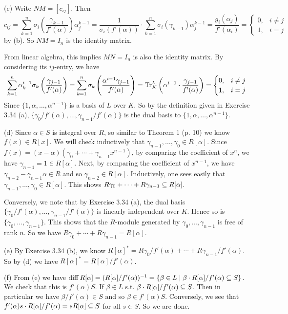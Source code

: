 \documentclass[../Marcus.tex]{subfiles}
\begin{document}
(c) Write $NM=[c_{ij}]$. Then
$$
c_{ij}
= \sum_{k=1}^n \sigma_i\left( \frac{\gamma_{k-1}}{f'(\alpha)} \right) \alpha_j^{k-1}
= \frac{1}{ \sigma_i(f'(\alpha)) } \cdot \sum_{k=1}^n \sigma_i(\gamma_{k-1}) \alpha_j^{k-1}
= \frac{ g_i(\alpha_j) }{ f'(\alpha_i) }
=
\begin{cases}
		0, & i\neq j \\
		1, & i = j
\end{cases}
$$
by (b). So $NM=I_n$ is the identity matrix.

From linear algebra, this implies $MN=I_n$ is also the identity matrix. By considering its $ij$-entry, we have
$$
\sum_{k=1}^n \alpha_k^{i-1}\sigma_k \left( \frac{\gamma_{j-1}}{f'(\alpha)} \right)
= \sum_{k=1}^n \sigma_k \left( \frac{ \alpha^{i-1} \gamma_{j-1} }{ f'(\alpha) } \right)
= \operatorname{Tr}^L_K \left( \alpha^{i-1} \cdot \frac{\gamma_{j-1}}{f'(\alpha)} \right)
=
\begin{cases}
		0, & i\neq j \\
		1, & i = j
\end{cases}
$$
Since $\{1,\alpha,\ldots,\alpha^{n-1}\}$ is a basis of $L$ over $K$. So by the definition given in Exercise 3.34 (a), $\{\gamma_0/f'(\alpha),\ldots,\gamma_{n-1}/f'(\alpha)\}$ is the dual basis to $\{1,\alpha,\ldots,\alpha^{n-1}\}$.

(d) Since $\alpha\in S$ is integral over $R$, so similar to Theorem 1 (p. 10) we know $f(x)\in R[x]$. We will check inductively that $\gamma_{n-1},\ldots,\gamma_0 \in R[\alpha]$. Since $f(x) = (x-\alpha)(\gamma_0+\cdots+\gamma_{n-1}x^{n-1})$, by comparing the coefficient of $x^n$, we have $\gamma_{n-1} = 1 \in R[\alpha]$. Next, by comparing the coefficient of $x^{n-1}$, we have $\gamma_{n-2}-\gamma_{n-1}\alpha \in R$ and so $\gamma_{n-2} \in R[\alpha]$. Inductively, one sees easily that $\gamma_{n-1},\ldots,\gamma_0 \in R[\alpha]$. This shows $R\gamma_0 + \cdots + R\gamma_{n-1} \subseteq R[\alpha]$.

Conversely, we note that by Exercise 3.34 (a), the dual basis $\{\gamma_0/f'(\alpha),\ldots,\gamma_{n-1}/f'(\alpha)\}$ is linearly independent over $K$. Hence so is $\{\gamma_0,\ldots,\gamma_{n-1}\}$. This shows that the $R$-module generated by $\gamma_0,\ldots,\gamma_{n-1}$ is free of rank $n$. So we have $R\gamma_0 + \cdots + R\gamma_{n-1} = R[\alpha]$. 

(e) By Exercise 3.34 (b), we know $R[\alpha]^* = R\gamma_0/f'(\alpha) + \cdots + R\gamma_{n-1}/f'(\alpha)$. So by (d) we have $R[\alpha]^* = R[\alpha]/f'(\alpha)$.

(f) From (e) we have $\operatorname{diff} R[\alpha] = (R[\alpha]/f'(\alpha))^{-1} = \{ \beta \in L \mid \beta \cdot R[\alpha]/f'(\alpha) \subseteq S\}$. We check that this is $f'(\alpha)S$. If $ \beta \in L$ s.t. $\beta \cdot R[\alpha]/f'(\alpha) \subseteq S$. Then in particular we have $\beta/f'(\alpha) \in S$ and so $\beta \in f'(\alpha)S$. Conversely, we see that $f'(\alpha)s \cdot R[\alpha]/f'(\alpha) = sR[\alpha] \subseteq S$ for all $s\in S$. So we are done.
\end{document}
